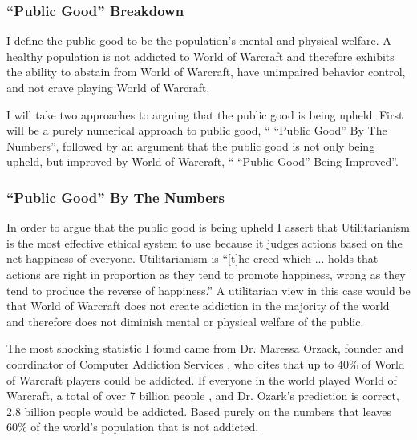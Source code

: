\documentclass[11pt]{article}
\begin{document}
\begin{multicols}{2}
\subsubsection{``Public Good'' Breakdown}
I define the public good to be the population's mental and physical welfare. A healthy population is not addicted to World of Warcraft and therefore exhibits the ability to abstain from World of Warcraft, have unimpaired behavior control, and not crave playing World of Warcraft.

I will take two approaches to arguing that the public good is being upheld. First will be a purely numerical approach to public good, `` ``Public Good'' By The Numbers'', followed by an argument that the public good is not only being upheld, but improved by World of Warcraft, `` ``Public Good'' Being Improved''.

\subsubsection{``Public Good'' By The Numbers}
In order to argue that the public good is being upheld I assert that Utilitarianism is the most effective ethical system to use because it judges actions based on the net happiness of everyone. Utilitarianism is ``[t]he creed which ... holds that actions are right in proportion as they tend to promote happiness, wrong as they tend to produce the reverse of happiness.'' \cite{Utilitarianism} A utilitarian view in this case would be that World of Warcraft does not create addiction in the majority of the world and therefore does not diminish mental or physical welfare of the public.

The most shocking statistic I found came from Dr. Maressa Orzack, founder and coordinator of Computer Addiction Services \cite{CompAddictionServices}, who cites that up to 40\% of World of Warcraft players could be addicted. \cite{FortyPercentAddicted} If everyone in the world played World of Warcraft, a total of over 7 billion people \cite{WorldPopulation}, and Dr. Ozark's prediction is correct, 2.8 billion people would be addicted. Based purely on the numbers that leaves 60\% of the world's population that is not addicted.


\end{multicols}
\end{document}
